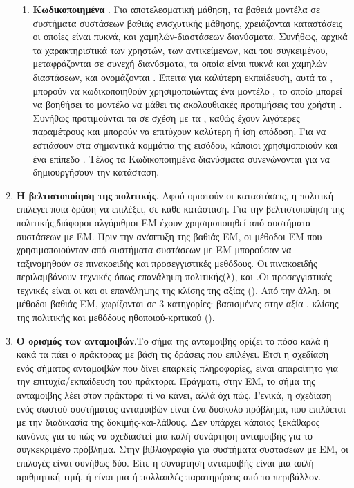 \begin{enumerate}
\begin{enumerate}
              \item \textbf{Κωδικοποιημένα }. Για αποτελεσματική μάθηση, τα βαθειά μοντέλα σε συστήματα συστάσεων βαθιάς ενισχυτικής μάθησης, χρειάζονται καταστάσεις οι οποίες είναι πυκνά, και χαμηλών-διαστάσεων διανύσματα. Συνήθως, αρχικά τα χαρακτηριστικά των χρηστών, των αντικείμενων, και του συγκειμένου, μεταφράζονται σε συνεχή διανύσματα, τα οποία είναι πυκνά και χαμηλών διαστάσεων, και ονομάζονται . Έπειτα για καλύτερη εκπαίδευση, αυτά τα , μπορούν να κωδικοποιηθούν χρησιμοποιώντας ένα μοντέλο , το οποίο μπορεί να βοηθήσει το μοντέλο να μάθει τις ακολουθιακές προτιμήσεις του χρήστη \cite{Zhao_2018}. Συνήθως προτιμούνται τα  σε σχέση με τα , καθώς έχουν λιγότερες παραμέτρους και μπορούν να επιτύχουν καλύτερη ή ίση απόδοση. Για να εστιάσουν στα σημαντικά κομμάτια της εισόδου, κάποιοι χρησιμοποιούν και ένα επίπεδο . Τέλος τα Κωδικοποιημένα διανύσματα συνενώνονται για να δημιουργήσουν την κατάσταση.
          \end{enumerate}
    \item \textbf{Η βελτιστοποίηση της πολιτικής}. Αφού οριστούν οι καταστάσεις, η πολιτική επιλέγει ποια δράση να επιλέξει, σε κάθε κατάσταση. Για την βελτιστοποίηση της πολιτικής,διάφοροι αλγόριθμοι ΕΜ έχουν χρησιμοποιηθεί από συστήματα συστάσεων με ΕΜ. Πριν την ανάπτυξη της βαθιάς ΕΜ, οι μέθοδοι ΕΜ που χρησιμοποιούνταν από συστήματα συστάσεων με ΕΜ μπορούσαν να ταξινομηθούν σε πινακοειδής και προσεγγιστικές μεθόδους. Οι πινακοειδής περιλαμβάνουν τεχνικές όπως επανάληψη πολιτικής(λ),  και .Οι προσεγγιστικές τεχνικές είναι οι  και οι επανάληψης της κλίσης της αξίας (). Από την άλλη, οι μέθοδοι βαθιάς ΕΜ, χωρίζονται σε 3 κατηγορίες: βασισμένες στην αξία , κλίσης της πολιτικής  και μεθόδους ηθοποιού-κριτικού ().
    \item \textbf{Ο ορισμός των ανταμοιβών}.Το σήμα της ανταμοιβής ορίζει το πόσο καλά ή κακά τα πάει ο πράκτορας με βάση τις δράσεις που επιλέγει. Έτσι η σχεδίαση ενός σήματος ανταμοιβών που δίνει επαρκείς πληροφορίες, είναι απαραίτητο για την επιτυχία/εκπαίδευση του πράκτορα. Πράγματι, στην ΕΜ, το σήμα της ανταμοιβής λέει στον πράκτορα τί να κάνει, αλλά όχι πώς. Γενικά, η σχεδίαση ενός σωστού συστήματος ανταμοιβών είναι ένα δύσκολο πρόβλημα, που επιλύεται με την διαδικασία της δοκιμής-και-λάθους. Δεν υπάρχει κάποιος ξεκάθαρος κανόνας για το πώς να σχεδιαστεί μια καλή συνάρτηση ανταμοιβής για το συγκεκριμένο πρόβλημα. Στην βιβλιογραφία για συστήματα συστάσεων με ΕΜ, οι επιλογές είναι συνήθως δύο. Είτε η συνάρτηση ανταμοιβής είναι μια απλή αριθμητική τιμή, ή είναι μια ή πολλαπλές παρατηρήσεις από το περιβάλλον.

\end{enumerate}
